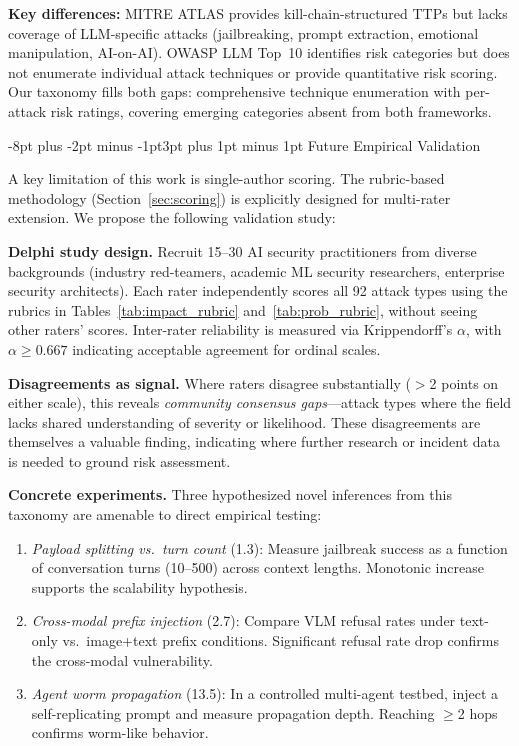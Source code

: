 \documentclass[conference]{IEEEtran}
\makeatletter
\renewcommand{\subsection}{\@startsection{subsection}{2}{\z@}%
  {-8pt plus -2pt minus -1pt}{3pt plus 1pt minus 1pt}%
  {\normalfont\normalsize\bfseries\sffamily\color{accentblue}}}
\makeatother
\begin{document}
\textbf{Key differences:} MITRE ATLAS provides kill-chain-structured TTPs but lacks coverage of LLM-specific attacks (jailbreaking, prompt extraction, emotional manipulation, AI-on-AI). OWASP LLM Top~10 identifies risk categories but does not enumerate individual attack techniques or provide quantitative risk scoring. Our taxonomy fills both gaps: comprehensive technique enumeration with per-attack risk ratings, covering emerging categories absent from both frameworks.

\subsection{Future Empirical Validation}\label{sec:empirical}

A key limitation of this work is single-author scoring. The rubric-based methodology (Section~\ref{sec:scoring}) is explicitly designed for multi-rater extension. We propose the following validation study:

\textbf{Delphi study design.} Recruit 15--30 AI security practitioners from diverse backgrounds (industry red-teamers, academic ML security researchers, enterprise security architects). Each rater independently scores all 92 attack types using the rubrics in Tables~\ref{tab:impact_rubric} and~\ref{tab:prob_rubric}, without seeing other raters' scores. Inter-rater reliability is measured via Krippendorff's $\alpha$, with $\alpha \geq 0.667$ indicating acceptable agreement for ordinal scales.

\textbf{Disagreements as signal.} Where raters disagree substantially ($>$2 points on either scale), this reveals \textit{community consensus gaps}---attack types where the field lacks shared understanding of severity or likelihood. These disagreements are themselves a valuable finding, indicating where further research or incident data is needed to ground risk assessment.

\textbf{Concrete experiments.} Three hypothesized novel inferences from this taxonomy are amenable to direct empirical testing:
\begin{enumerate}[leftmargin=*, nosep]
\item \textit{Payload splitting vs.\ turn count} (1.3): Measure jailbreak success as a function of conversation turns (10--500) across context lengths. Monotonic increase supports the scalability hypothesis.
\item \textit{Cross-modal prefix injection} (2.7): Compare VLM refusal rates under text-only vs.\ image+text prefix conditions. Significant refusal rate drop confirms the cross-modal vulnerability.
\item \textit{Agent worm propagation} (13.5): In a controlled multi-agent testbed, inject a self-replicating prompt and measure propagation depth. Reaching $\geq$2 hops confirms worm-like behavior.
\end{enumerate}
\end{document}
